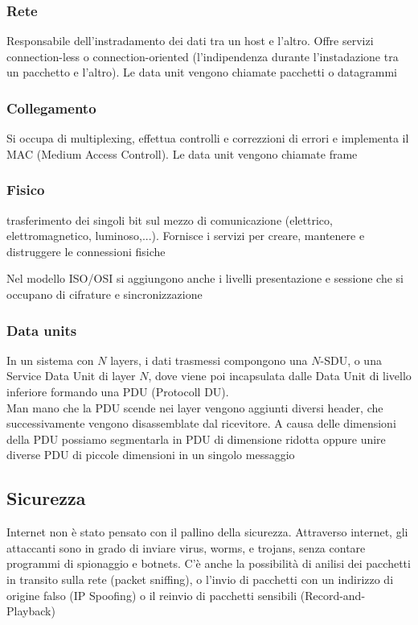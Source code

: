 \documentclass[12pt, a4paper]{article}
\begin{document}
\subsubsection*{Rete}
Responsabile dell'instradamento dei dati tra un host e l'altro. Offre servizi connection-less o connection-oriented 
(l'indipendenza durante l'instadazione tra un pacchetto e l'altro). Le data unit vengono chiamate pacchetti o datagrammi
\subsubsection*{Collegamento}
Si occupa di multiplexing, effettua controlli e correzzioni di errori e implementa il MAC (Medium Access Controll).
Le data unit vengono chiamate frame
\subsubsection*{Fisico}
trasferimento dei singoli bit sul mezzo di comunicazione (elettrico, elettromagnetico, luminoso,...). Fornisce i servizi per
creare, mantenere e distruggere le connessioni fisiche

Nel modello ISO/OSI si aggiungono anche i livelli presentazione e sessione che si occupano di cifrature e 
sincronizzazione

\subsubsection{Data units}
In un sistema con $N$ layers, i dati trasmessi compongono una $N$-SDU, o una Service Data Unit di layer $N$, dove viene poi
incapsulata dalle Data Unit di livello inferiore formando una PDU (Protocoll DU).\\Man mano che la PDU scende nei layer 
vengono aggiunti diversi header, che successivamente vengono disassemblate dal ricevitore. A causa delle dimensioni della
PDU possiamo segmentarla in PDU di dimensione ridotta oppure unire diverse PDU di piccole dimensioni in un singolo messaggio

\subsection{Sicurezza}
Internet non è stato pensato con il pallino della sicurezza. Attraverso internet, gli attaccanti sono in grado di inviare 
virus, worms, e trojans, senza contare programmi di spionaggio e botnets. C'è anche la possibilità di anilisi dei pacchetti
in transito sulla rete (packet sniffing), o l'invio di pacchetti con un indirizzo di origine falso (IP Spoofing) o il 
reinvio di pacchetti sensibili (Record-and-Playback)
\end{document}
